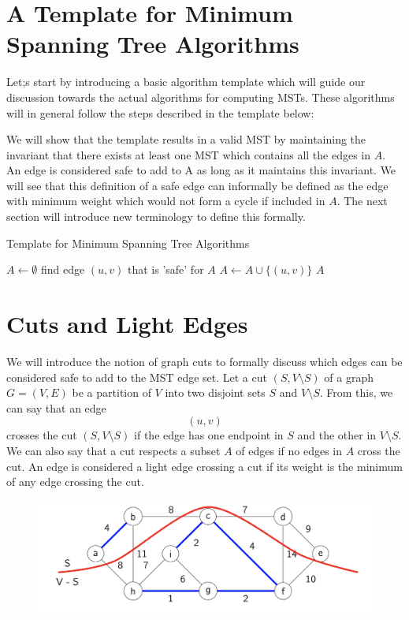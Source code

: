 \documentclass [12pt]{article}
\theoremstyle{definition}
\begin{document}
\section{ A Template for Minimum Spanning Tree Algorithms}
Let;s start by introducing a basic algorithm template which will guide our discussion towards the actual algorithms for computing MSTs. These algorithms will in general follow the steps described in the template below: 

We will show that the template results in a valid MST by maintaining the invariant that there exists at least one MST which contains all the edges in $A$. An edge is considered safe to add to A as long as it maintains this invariant. We will see that this definition of a safe edge can informally be defined as the edge with minimum weight which would not form a cycle if included in $A$. The next section will introduce new terminology to define this formally.

\begin{algorithm}
\caption{Template for Minimum Spanning Tree Algorithms}
\label{alg:mst_template}
\begin{algorithmic}
\State $A \gets \emptyset$
\State {} {
    \State find edge $(u,v)$ that is 'safe' for $A$
    \State $A \gets A \cup \{(u,v)\}$
}
\State \Return $A$
\end{algorithmic}
\end{algorithm}

\section{Cuts and Light Edges}
 
We will introduce the notion of graph cuts to formally discuss which edges can be considered safe to add to the MST edge set. Let a cut $(S, V \setminus S)$ of a graph $G = (V, E)$ be a partition of $V$ into two disjoint sets $S$ and $V \setminus S$. From this, we can say that an edge $$(u, v )$$ crosses the cut $(S, V \setminus S)$ if the edge has one endpoint in $S$ and the other in $V \setminus S$. We can also say that a cut respects a subset $A$ of edges if no edges in $A$ cross the cut. An edge is considered a light edge crossing a cut if its weight is the minimum of any edge crossing the cut.

\begin{figure}[h!]
\centering
\includegraphics[scale=0.5]{mst_cuts.png}
\label{}
\label{fig:mst_cuts}
\end{figure}
\end{document}
